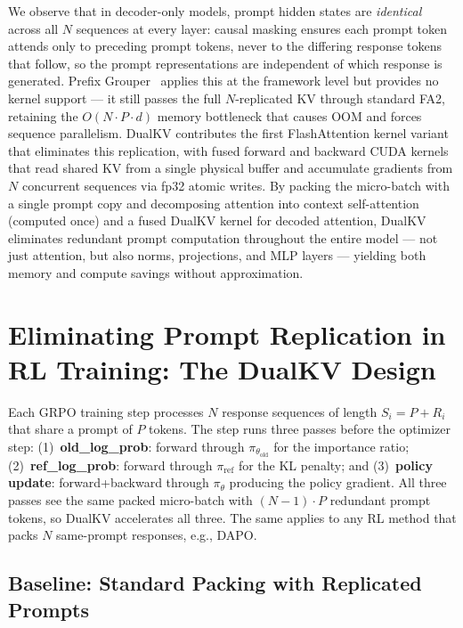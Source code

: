 \documentclass{article}
\begin{document}
We observe that in decoder-only models, prompt hidden states are \emph{identical} across all $N$ sequences at every layer: causal masking ensures each prompt token attends only to preceding prompt tokens, never to the differing response tokens that follow, so the prompt representations are independent of which response is generated. Prefix Grouper~\citep{liu2025prefixgrouper} applies this at the framework level but provides no kernel support --- it still passes the full $N$-replicated KV through standard FA2, retaining the $O(N \cdot P \cdot d)$ memory bottleneck that causes OOM and forces sequence parallelism. DualKV contributes the first FlashAttention kernel variant that eliminates this replication, with fused forward and backward CUDA kernels that read shared KV from a single physical buffer and accumulate gradients from $N$ concurrent sequences via fp32 atomic writes. By packing the micro-batch with a single prompt copy and decomposing attention into context self-attention (computed once) and a fused DualKV kernel for decoded attention, DualKV eliminates redundant prompt computation throughout the entire model --- not just attention, but also norms, projections, and MLP layers --- yielding both memory and compute savings without approximation.

\section{Eliminating Prompt Replication in RL Training: The DualKV Design}
\label{sec:training}

Each GRPO training step processes $N$ response sequences of length $S_i = P + R_i$ that share a prompt of $P$ tokens. The step runs three passes before the optimizer step: (1)~\textbf{old\_log\_prob}: forward through $\pi_{\theta_{\text{old}}}$ for the importance ratio; (2)~\textbf{ref\_log\_prob}: forward through $\pi_{\text{ref}}$ for the KL penalty; and (3)~\textbf{policy update}: forward+backward through $\pi_\theta$ producing the policy gradient. All three passes see the same packed micro-batch with $(N{-}1) \cdot P$ redundant prompt tokens, so DualKV accelerates all three. The same applies to any RL method that packs $N$ same-prompt responses, e.g., DAPO.

\subsection{Baseline: Standard Packing with Replicated Prompts}
\end{document}

